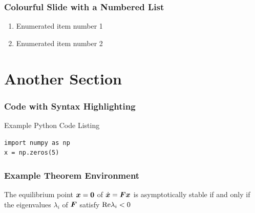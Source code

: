 \documentclass[fleqn]{qu-slides}
\begin{document}


\SlideThemeWhite
\begin{frame}
    \frametitle{Colourful Slide with a Numbered List}
    \begin{enumerate}
        \item Enumerated item number 1
        \item Enumerated item number 2
    \end{enumerate}
\end{frame}


\section{Another Section}

\SlideThemeGrey
\begin{frame}[plain]
    \flushleft
    {\bf\LARGE \insertsection}
\end{frame}


\SlideWhite
\begin{frame}[fragile]
    \frametitle{Code with Syntax Highlighting}
    \begin{block}{Example Python Code Listing}
    \begin{verbatim}
import numpy as np
x = np.zeros(5)
    \end{verbatim}
    \end{block}
\end{frame}


\SlideWhite
\begin{frame}[fragile]
    \frametitle{Example Theorem Environment}
    \begin{thm}
        The equilibrium point $\bm{x}=\bm{0}$ of $\dot{\bm{x}}=\bm{Fx}$ is asymptotically stable if and only if the eigenvalues $\lambda_{i}$ of $\bm{F}$ satisfy $\textup{Re}\lambda_{i}<0$
    \end{thm}
\end{frame}
\end{document}

